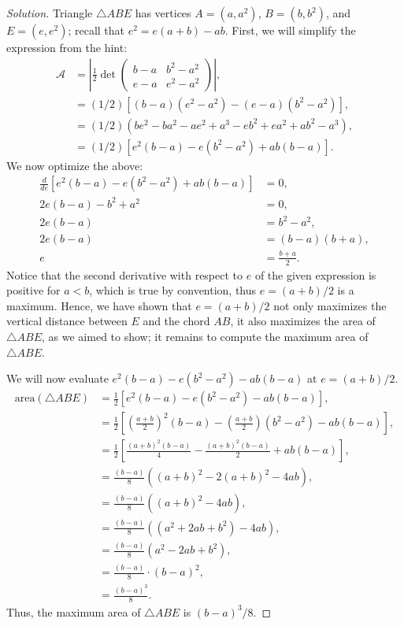\documentclass[letterpaper, 12pt]{amsart}
\theoremstyle{definition}  %
\begin{document}
		\begin{proof}[Solution]
		Triangle $\triangle ABE$ has vertices $A = (a, a^{2})$, $B = (b, b^{2})$, and $E = (e, e^{2})$; recall that $e^{2} = e(a + b) - ab$.
		First, we will simplify the expression from the hint:
			\begin{align*}
				\mathcal{A} &= \left| \frac{1}{2} \det{\begin{pmatrix} b - a & b^{2} - a^{2} \\ e - a & e^{2} - a^{2} \end{pmatrix}} \right|, \\
				&= (1/2) \left[ (b - a)(e^{2} - a^{2}) - (e - a)(b^{2} - a^{2}) \right], \\
				&= (1/2) ( be^{2} - ba^{2} - ae^{2} + a^{3} - eb^{2} + ea^{2} + ab^{2} - a^{3} ), \\
				&= (1/2) \left[ e^{2}(b - a) - e\left(b^{2} - a^{2} \right) + ab(b - a) \right].
			\end{align*}
		We now optimize the above:
			\begin{align*}
				\frac{d}{de}\left[ e^{2}(b - a) - e\left(b^{2} - a^{2} \right) + ab(b - a) \right] &= 0, \\
				2e(b - a) - b^{2} + a^{2} &= 0, \\
				2e(b - a) &= b^{2} - a^{2}, \\
				2e(b - a) &= (b - a)(b + a), \\
				e &= \frac{b + a}{2}.
			\end{align*}
		Notice that the second derivative with respect to $e$ of the given expression is positive for $a < b$, which is true by convention, thus $e = (a + b)/2$ is a maximum.
		Hence, we have shown that $e = (a + b)/2$ not only maximizes the vertical distance between $E$ and the chord $AB$, it also maximizes the area of $\triangle ABE$, as we aimed to show; it remains to compute the maximum area of $\triangle ABE$.
		
		We will now evaluate $e^{2}(b - a) - e\left(b^{2} - a^{2} \right) - ab(b - a)$ at $e = (a + b)/2$.
			\begin{align*}
			\text{area}(\triangle ABE) &= \frac{1}{2}\left[ e^{2}(b - a) - e\left(b^{2} - a^{2} \right) - ab(b - a) \right], \\
			&= \frac{1}{2}\left[ \left( \frac{a + b}{2} \right)^{2}(b - a) - \left( \frac{a + b}{2} \right)\left(b^{2} - a^{2} \right) - ab(b - a) \right], \\
			&= \frac{1}{2}\left[ \frac{(a + b)^{2}(b-a)}{4} - \frac{(a+b)^{2}(b-a)}{2} + ab(b-a) \right], \\
			&= \frac{(b - a)}{8} \left( (a+b)^{2} - 2(a+b)^{2} - 4ab \right), \\
			&= \frac{(b - a)}{8} \left( (a+b)^{2} - 4ab \right), \\
			&= \frac{(b - a)}{8} \left( (a^{2} + 2ab + b^{2}) - 4ab \right), \\
			&= \frac{(b - a)}{8} \left( a^{2} - 2ab + b^{2} \right), \\
			&= \frac{(b - a)}{8} \cdot (b - a)^{2}, \\
			&= \frac{(b - a)^{3}}{8}.
			\end{align*}
		Thus, the maximum area of $\triangle ABE$ is $(b - a)^{3}/8$.
		\end{proof}
\end{document}

